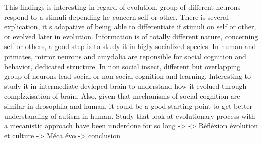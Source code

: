 \documentclass[a4paper, 12pt]{article}
\begin{document}
This findings is interesting in regard of evolution, group of different neurons respond to a stimuli depending he concern self or other. There is several explication, it s adapative of being able to differentiate if stimuli on self or other, or evolved later in evolution. Information is of totally different nature, concerning self or others, a good step is to study it in higly socialized species.
In human and primates, mirror neurons and amydalia are reponsible for social cognition and behavior, dedicated structure. In non social insect, different but overlapping group of neurons lead social or non social cognition and learning. Interesting to study it in  intermediate devloped brain to understand how it evolued through complzxisation of brain.
Also, given that mechanisms of social cognition are similar in drosophila and human, it could be a good starting point to get better understanding of autism in human.
Study that  look at evolutionary process with a mecanistic approach have been underdone for so long ->
-> Réfléxion évolution et culture
-> Méca évo
-> conclusion
 





\clearpage
\newrefcontext[sorting=nyt] %
\printbibliography
 
\end{document}
